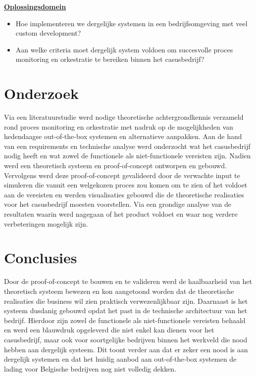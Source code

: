 \documentclass[a0,portrait]{hogent-poster}
\begin{document}
\begin{multicols}{2}
\underline{\textbf{Oplossingsdomein}}
\begin{itemize}
  \item Hoe implementeren we dergelijke systemen in een bedrijfsomgeving met veel custom development?
  \item Aan welke criteria moet dergelijk system voldoen om succesvolle proces monitoring en orkestratie te bereiken binnen het casusbedrijf?
\end{itemize}

\section{Onderzoek}
Via een literatuurstudie werd nodige theoretische achtergrondkennis verzameld rond proces monitoring en orkestratie met nadruk op de mogelijkheden van hedendaagse out-of-the-box systemen en alternatieve aanpakken. Aan de hand van een requirements en technische analyse werd onderzocht wat het casusbedrijf nodig heeft en wat zowel de functionele als niet-functionele vereisten zijn. Nadien werd een theoretisch systeem en proof-of-concept ontworpen en gebouwd. Vervolgens werd deze proof-of-concept gevalideerd door de verwachte input te simuleren die vanuit een welgekozen proces zou komen om te zien of het voldoet aan de vereisten en werden visualisaties gebouwd die de theoretische realisaties voor het casusbedrijf moesten voorstellen. Via een grondige analyse van de resultaten waarin werd nagegaan of het product voldoet en waar nog verdere verbeteringen mogelijk zijn.

\section{Conclusies}
Door de proof-of-concept te bouwen en te valideren werd de haalbaarheid van het theoretisch systeem bewezen en kon aangetoond worden dat de theoretische realisaties die business wil zien praktisch verwezenlijkbaar zijn. Daarnaast is het systeem dusdanig gebouwd opdat het past in de technische architectuur van het bedrijf. Hierdoor zijn zowel de functionele als niet-functionele vereisten behaald en werd een blauwdruk opgeleverd die niet enkel kan dienen voor het casusbedrijf, maar ook voor soortgelijke bedrijven binnen het werkveld die nood hebben aan dergelijk systeem. Dit toont verder aan dat er zeker een nood is aan dergelijk systemen en dat het huidig aanbod aan out-of-the-box systemen de lading voor Belgische bedrijven nog niet volledig dekken.


\end{multicols}
\end{document}
